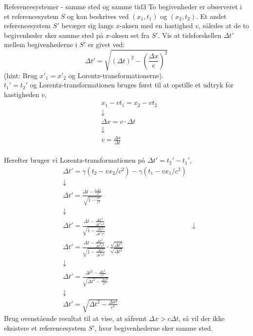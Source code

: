 \begin{opgave}{Referencesystemer - samme sted og samme tid}{3}
	To begivenheder er observeret i et referencesystem $S$ og kan beskrives ved $\left( x_1 , t_1 \right)$ og $\left( x_2 , t_2 \right)$. Et andet referencesystem $S'$ bevæger sig langs $x$-aksen med en hastighed $v$, således at de to begivenheder sker samme sted på $x$-aksen set fra $S'$.
	\opg Vis at tidsforskellen $\Delta t'$ mellem begivenhederne i $S'$ er givet ved:
	$$\Delta t' = \sqrt{\left( \Delta t \right)^2 - \left( \frac{\Delta x}{c} \right)^2}$$
	(hint: Brug $x'_1 = x'_2$ og Lorentz-transformationerne).\\
	
	$t_1'=t_2'$ og Lorentz-transformationen bruges først til at opstille et udtryk for hastigheden $v$,
	\begin{align*}
	&x_1-vt_1=x_2-vt_2 \\
	&\downarrow \\
	&\Delta x=v \cdot \Delta t \\
	&\downarrow \\
	&v=\frac{\Delta x}{\Delta t} \\
	\end{align*}
	
	Herefter bruger vi Lorentz-transformationen på $\Delta t'=t_2'-t_1'$,
	\begin{align*}
	&\Delta t'=\gamma(t_2-vx_2/c^2)-\gamma(t_1-vx_1/c^2) \\
	&\downarrow \\
	&\Delta t'=\frac{\Delta t-\frac{v\Delta x}{c^2}}{\sqrt{1-\frac{v^2}{c^2}}} \\
	&\downarrow \\
	&\Delta t'=\frac{\Delta t - \frac{\Delta x^2}{\Delta t^2c^2}}{\sqrt{1-\frac{\Delta x^2}{\Delta t^2c^2}}}
	&\downarrow \\
	&\Delta t'=\frac{\Delta t - \frac{\Delta x^2}{\Delta t^2c^2}}{\sqrt{1-\frac{\Delta x^2}{\Delta t^2c^2}}} \cdot \frac{\sqrt{\Delta t^2}}{\sqrt{\Delta t^2}} \\
	&\downarrow \\
	&\Delta t'=\frac{\Delta t^2-\frac{\Delta x^2}{c^2}}{\sqrt{\Delta t^2-\frac{\Delta x^2}{c^2}}} \\
	&\downarrow \\
	&\Delta t' = \sqrt{\Delta t^2-\frac{\Delta x^2}{c^2}}
	\end{align*}
	\opg Brug ovenstående resultat til at vise, at såfremt $\Delta x > c \Delta t$, så vil der ikke eksistere et referencesystem $S'$, hvor begivenhederne sker samme sted.\\
	

\end{opgave}
